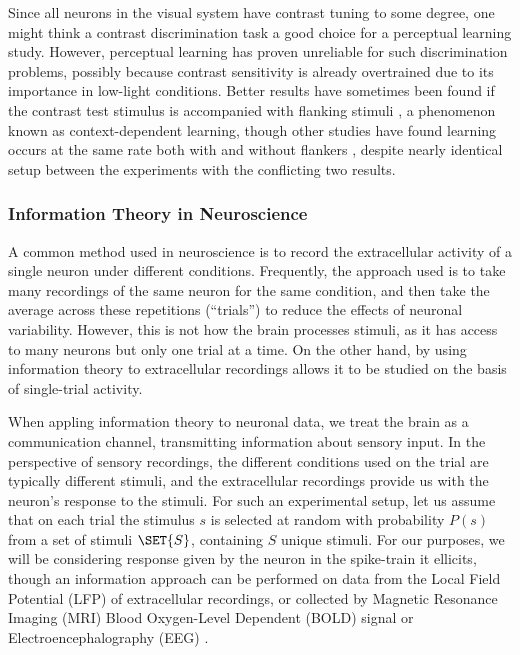 Since all neurons in the visual system have contrast tuning to some degree, one might think a contrast discrimination task a good choice for a perceptual learning study. However, perceptual learning has proven unreliable for such discrimination problems, possibly because contrast sensitivity is already overtrained due to its importance in low-light conditions. Better results have sometimes been found if the contrast test stimulus is accompanied with flanking stimuli \cite{Adini2002}, a phenomenon known as context-dependent learning, though other studies have found learning occurs at the same rate both with and without flankers \cite{Yu2004}, despite nearly identical setup between the experiments with the conflicting two results.

\subsubsection{Information Theory in Neuroscience}
\label{sec:bgit}

A common method used in neuroscience is to record the extracellular activity of a single neuron under different conditions. Frequently, the approach used is to take many recordings of the same neuron for the same condition, and then take the average across these repetitions (``trials'') to reduce the effects of neuronal variability. However, this is not how the brain processes stimuli, as it has access to many neurons but only one trial at a time.
On the other hand, by using information theory to extracellular recordings allows it to be studied on the basis of single-trial activity.

When appling information theory to neuronal data, we treat the brain as a communication channel, transmitting information about sensory input. 
In the perspective of sensory recordings, the different conditions used on the trial are typically different stimuli, and the extracellular recordings provide us with the neuron's response to the stimuli.
For such an experimental setup, let us assume that on each trial the stimulus $s$ is selected at random with probability $P(s)$ from a set of stimuli $\SET{S}$, containing $S$ unique stimuli.
For our purposes, we will be considering response given by the neuron in the spike-train it ellicits, though an information approach can be performed on data from the Local Field Potential (LFP) of extracellular recordings, or collected by Magnetic Resonance Imaging (MRI) Blood Oxygen-Level Dependent (BOLD) signal or Electroencephalography (EEG) \cite{Magri2009,Quiroga2009}.

